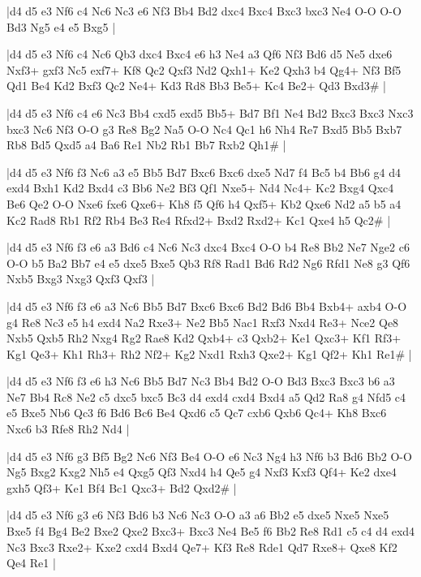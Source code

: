 \whitename{}
\blackname{}
\makegametitle
|d4 d5 e3 Nf6 c4 Nc6 Nc3 e6 Nf3 Bb4 Bd2 dxc4 Bxc4 Bxc3 bxc3 Ne4 O-O O-O Bd3 Ng5 e4 e5 Bxg5  |

\whitename{}
\blackname{}
\makegametitle
|d4 d5 e3 Nf6 c4 Nc6 Qb3 dxc4 Bxc4 e6 h3 Ne4 a3 Qf6 Nf3 Bd6 d5 Ne5 dxe6 Nxf3+ gxf3 Nc5 exf7+ Kf8 Qc2 Qxf3 Nd2 Qxh1+ Ke2 Qxh3 b4 Qg4+ Nf3 Bf5 Qd1 Be4 Kd2 Bxf3 Qc2 Ne4+ Kd3 Rd8 Bb3 Be5+ Kc4 Be2+ Qd3 Bxd3\#  |

\whitename{}
\blackname{}
\makegametitle
|d4 d5 e3 Nf6 c4 e6 Nc3 Bb4 cxd5 exd5 Bb5+ Bd7 Bf1 Ne4 Bd2 Bxc3 Bxc3 Nxc3 bxc3 Nc6 Nf3 O-O g3 Re8 Bg2 Na5 O-O Nc4 Qc1 h6 Nh4 Re7 Bxd5 Bb5 Bxb7 Rb8 Bd5 Qxd5 a4 Ba6 Re1 Nb2 Rb1 Bb7 Rxb2 Qh1\#  |

\whitename{}
\blackname{}
\makegametitle
|d4 d5 e3 Nf6 f3 Nc6 a3 e5 Bb5 Bd7 Bxc6 Bxc6 dxe5 Nd7 f4 Bc5 b4 Bb6 g4 d4 exd4 Bxh1 Kd2 Bxd4 c3 Bb6 Ne2 Bf3 Qf1 Nxe5+ Nd4 Nc4+ Kc2 Bxg4 Qxc4 Be6 Qe2 O-O Nxe6 fxe6 Qxe6+ Kh8 f5 Qf6 h4 Qxf5+ Kb2 Qxe6 Nd2 a5 b5 a4 Kc2 Rad8 Rb1 Rf2 Rb4 Be3 Re4 Rfxd2+ Bxd2 Rxd2+ Kc1 Qxe4 h5 Qc2\#  |

\whitename{}
\blackname{}
\makegametitle
|d4 d5 e3 Nf6 f3 e6 a3 Bd6 c4 Nc6 Nc3 dxc4 Bxc4 O-O b4 Re8 Bb2 Ne7 Nge2 c6 O-O b5 Ba2 Bb7 e4 e5 dxe5 Bxe5 Qb3 Rf8 Rad1 Bd6 Rd2 Ng6 Rfd1 Ne8 g3 Qf6 Nxb5 Bxg3 Nxg3 Qxf3 Qxf3  |

\whitename{}
\blackname{}
\makegametitle
|d4 d5 e3 Nf6 f3 e6 a3 Nc6 Bb5 Bd7 Bxc6 Bxc6 Bd2 Bd6 Bb4 Bxb4+ axb4 O-O g4 Re8 Nc3 e5 h4 exd4 Na2 Rxe3+ Ne2 Bb5 Nac1 Rxf3 Nxd4 Re3+ Nce2 Qe8 Nxb5 Qxb5 Rh2 Nxg4 Rg2 Rae8 Kd2 Qxb4+ c3 Qxb2+ Ke1 Qxc3+ Kf1 Rf3+ Kg1 Qe3+ Kh1 Rh3+ Rh2 Nf2+ Kg2 Nxd1 Rxh3 Qxe2+ Kg1 Qf2+ Kh1 Re1\#  |

\whitename{}
\blackname{}
\makegametitle
|d4 d5 e3 Nf6 f3 e6 h3 Nc6 Bb5 Bd7 Nc3 Bb4 Bd2 O-O Bd3 Bxc3 Bxc3 b6 a3 Ne7 Bb4 Rc8 Ne2 c5 dxc5 bxc5 Bc3 d4 exd4 cxd4 Bxd4 a5 Qd2 Ra8 g4 Nfd5 c4 e5 Bxe5 Nb6 Qc3 f6 Bd6 Bc6 Be4 Qxd6 c5 Qc7 cxb6 Qxb6 Qc4+ Kh8 Bxc6 Nxc6 b3 Rfe8 Rh2 Nd4  |

\whitename{}
\blackname{}
\makegametitle
|d4 d5 e3 Nf6 g3 Bf5 Bg2 Nc6 Nf3 Be4 O-O e6 Nc3 Ng4 h3 Nf6 b3 Bd6 Bb2 O-O Ng5 Bxg2 Kxg2 Nh5 e4 Qxg5 Qf3 Nxd4 h4 Qe5 g4 Nxf3 Kxf3 Qf4+ Ke2 dxe4 gxh5 Qf3+ Ke1 Bf4 Bc1 Qxc3+ Bd2 Qxd2\#  |

\whitename{}
\blackname{}
\makegametitle
|d4 d5 e3 Nf6 g3 e6 Nf3 Bd6 b3 Nc6 Nc3 O-O a3 a6 Bb2 e5 dxe5 Nxe5 Nxe5 Bxe5 f4 Bg4 Be2 Bxe2 Qxe2 Bxc3+ Bxc3 Ne4 Be5 f6 Bb2 Re8 Rd1 c5 c4 d4 exd4 Nc3 Bxc3 Rxe2+ Kxe2 cxd4 Bxd4 Qe7+ Kf3 Re8 Rde1 Qd7 Rxe8+ Qxe8 Kf2 Qe4 Re1  |

